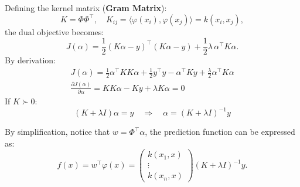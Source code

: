 \documentclass[../main]{subfiles}
\begin{document}
Defining the kernel matrix (\textbf{Gram Matrix}):
\begin{equation}
    K = \Phi \Phi^\top, \quad K_{ij} = \langle \varphi(x_i), \varphi(x_j) \rangle = k(x_i, x_j),
\end{equation}
the dual objective becomes:
\begin{equation}
    J(\alpha)
    = \frac{1}{2} (K\alpha - y)^\top (K\alpha - y)
    + \frac{1}{2}\lambda\, \alpha^\top K \alpha.
\end{equation}
By derivation:
\begin{gather}
    J(\alpha)=\frac{1}{2}\alpha^\top KK\alpha+\frac{1}{2}y^\top y-\alpha^\top Ky+\frac{\lambda}{2}\alpha^\top K\alpha\\
    \frac{\partial J(\alpha)}{\partial\alpha}=KK\alpha-Ky+\lambda K\alpha=0
\end{gather}
If $K\succ 0$:
\begin{equation}
    (K + \lambda I)\alpha = y\quad \Rightarrow\quad \alpha=(K+\lambda I)^{-1} y
\end{equation}

By simplification, notice that $w=\Phi^\top\alpha$, the prediction function can be expressed as:
\begin{equation}
    f(x) = w^\top \varphi(x)
    = \begin{pmatrix}
        k(x_1, x)\\
        \vdots\\
        k(x_n, x)
    \end{pmatrix}(K+\lambda I)^{-1} y .\label{equ:4.61}
\end{equation}
\end{document}
